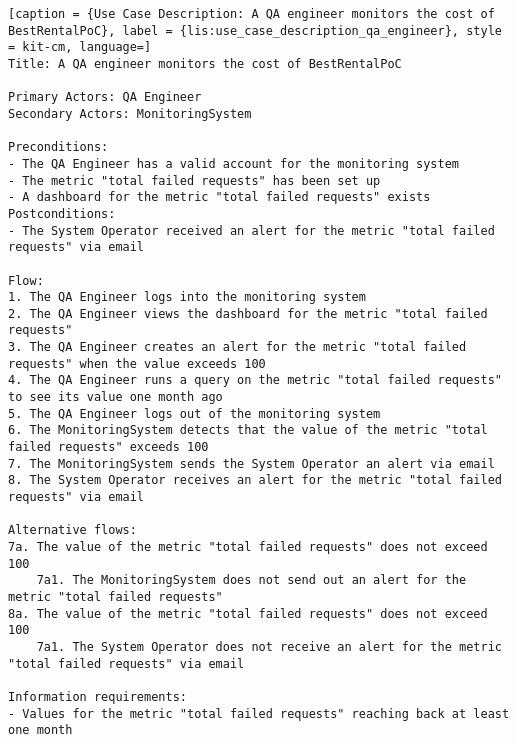 \vspace{0.5cm}
\begin{lstlisting}[caption = {Use Case Description: A QA engineer monitors the cost of BestRentalPoC}, label = {lis:use_case_description_qa_engineer}, style = kit-cm, language=] 
Title: A QA engineer monitors the cost of BestRentalPoC

Primary Actors: QA Engineer
Secondary Actors: MonitoringSystem

Preconditions:
- The QA Engineer has a valid account for the monitoring system
- The metric "total failed requests" has been set up
- A dashboard for the metric "total failed requests" exists
Postconditions:
- The System Operator received an alert for the metric "total failed requests" via email

Flow:
1. The QA Engineer logs into the monitoring system
2. The QA Engineer views the dashboard for the metric "total failed requests"
3. The QA Engineer creates an alert for the metric "total failed requests" when the value exceeds 100
4. The QA Engineer runs a query on the metric "total failed requests" to see its value one month ago
5. The QA Engineer logs out of the monitoring system
6. The MonitoringSystem detects that the value of the metric "total failed requests" exceeds 100
7. The MonitoringSystem sends the System Operator an alert via email
8. The System Operator receives an alert for the metric "total failed requests" via email

Alternative flows:
7a. The value of the metric "total failed requests" does not exceed 100
	7a1. The MonitoringSystem does not send out an alert for the metric "total failed requests"
8a. The value of the metric "total failed requests" does not exceed 100
	7a1. The System Operator does not receive an alert for the metric "total failed requests" via email

Information requirements:
- Values for the metric "total failed requests" reaching back at least one month
\end{lstlisting}



